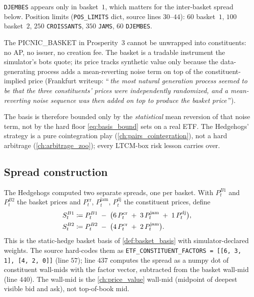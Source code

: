 \texttt{DJEMBES} appears only in basket~$1$, which matters for the
inter-basket spread below. Position limits (\texttt{POS\_LIMITS}
dict, source lines $30$--$44$): $60$ basket~$1$, $100$ basket~$2$,
$250$ \texttt{CROISSANTS}, $350$ \texttt{JAMS}, $60$
\texttt{DJEMBES}.

\begin{pitfallbox}
\label{pitfall:no_create_redeem}
The PICNIC\_BASKET in Prosperity~$3$ cannot be unwrapped into
constituents: no AP, no issuer, no creation fee. The basket is a
tradable instrument the simulator's bots quote; its price tracks
synthetic value only because the data-generating process adds a
mean-reverting noise term on top of the constituent-implied price
(Frankfurt writeup: ``\,\emph{the most natural generation process
seemed to be that the three constituents' prices were
independently randomized, and a mean-reverting noise sequence was
then added on top to produce the basket price}\,'').

The basis is therefore bounded only by the \emph{statistical}
mean reversion of that noise term, not by the hard floor
\eqref{eq:basis_bound} sets on a real ETF. The Hedgehogs' strategy
is a pure cointegration play (\cref{ch:pairs_cointegration}), not
a hard arbitrage (\cref{ch:arbitrage_zoo}); every LTCM-box risk
lesson carries over.
\end{pitfallbox}

\subsection{Spread construction}
\label{sec:ch11_hh_spread_construction}

The Hedgehogs computed two separate spreads, one per basket. With
$P^{B1}_t$ and $P^{B2}_t$ the basket prices and
$P^{\text{cr}}_t$, $P^{\text{jam}}_t$, $P^{\text{dj}}_t$ the
constituent prices, define
\begin{align}
  S^{B1}_t &\coloneqq P^{B1}_t \;-\; \bigl(6\,P^{\text{cr}}_t \;+\; 3\,P^{\text{jam}}_t \;+\; 1\,P^{\text{dj}}_t\bigr),
  \label{eq:s_b1}\\
  S^{B2}_t &\coloneqq P^{B2}_t \;-\; \bigl(4\,P^{\text{cr}}_t \;+\; 2\,P^{\text{jam}}_t\bigr).
  \label{eq:s_b2}
\end{align}
This is the static-hedge basket basis of
\cref{def:basket_basis} with simulator-declared weights. The
source hard-codes them as
\texttt{ETF\_CONSTITUENT\_FACTORS = [[6, 3, 1], [4, 2, 0]]} (line
$57$); line $437$ computes the spread as a numpy dot of
constituent wall-mids with the factor vector, subtracted from the
basket wall-mid (line $440$). The wall-mid is the
\cref{ch:price_value} wall-mid (midpoint of deepest visible bid
and ask), not top-of-book mid.

